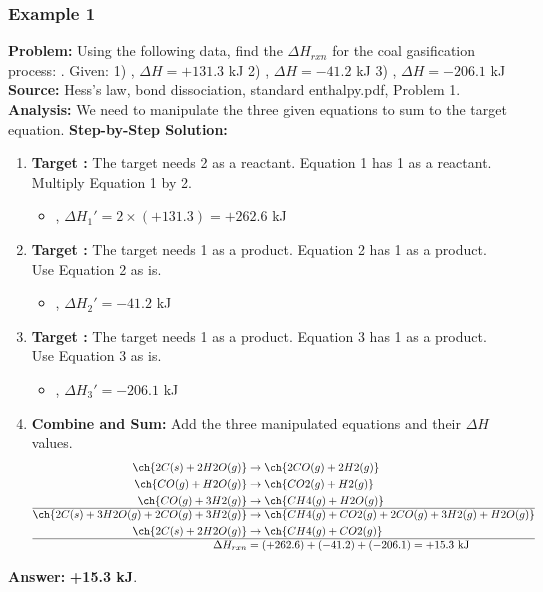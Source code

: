 \documentclass{article}
\begin{document}
\subsubsection{Example 1}
\textbf{Problem:} Using the following data, find the $\Delta H_{rxn}$ for the coal gasification process: .
Given:
1) , $\Delta H = +131.3$ kJ
2) , $\Delta H = -41.2$ kJ
3) , $\Delta H = -206.1$ kJ
\textbf{Source:} Hess's law, bond dissociation, standard enthalpy.pdf, Problem 1.
\textbf{Analysis:} We need to manipulate the three given equations to sum to the target equation.
\textbf{Step-by-Step Solution:}
\begin{enumerate}
    \item \textbf{Target :} The target needs 2  as a reactant. Equation 1 has 1  as a reactant. Multiply Equation 1 by 2.
    \begin{itemize}
        \item {}, $\Delta H_1' = 2 \times (+131.3) = +262.6$ kJ
    \end{itemize}
    \item \textbf{Target :} The target needs 1  as a product. Equation 2 has 1  as a product. Use Equation 2 as is.
    \begin{itemize}
        \item {}, $\Delta H_2' = -41.2$ kJ
    \end{itemize}
    \item \textbf{Target :} The target needs 1  as a product. Equation 3 has 1  as a product. Use Equation 3 as is.
    \begin{itemize}
        \item {}, $\Delta H_3' = -206.1$ kJ
    \end{itemize}
    \item \textbf{Combine and Sum:} Add the three manipulated equations and their $\Delta H$ values.
    \begin{align*}
        \ch{2C(s) + 2H2O(g)} &\rightarrow \ch{2CO(g) + 2H2(g)} \\
        \ch{CO(g) + H2O(g)} &\rightarrow \ch{CO2(g) + H2(g)} \\
        \ch{CO(g) + 3H2(g)} &\rightarrow \ch{CH4(g) + H2O(g)} \\
        \hline
        \ch{2C(s) + 3H2O(g) + 2CO(g) + 3H2(g)} &\rightarrow \ch{CH4(g) + CO2(g) + 2CO(g) + 3H2(g) + H2O(g)} \\
        \ch{2C(s) + 2H2O(g)} &\rightarrow \ch{CH4(g) + CO2(g)} \\
        \hline
        \Delta H_{rxn} &= (+262.6) + (-41.2) + (-206.1) = +15.3 \text{ kJ}
    \end{align*}
\end{enumerate}
\textbf{Answer:} \textbf{+15.3 kJ}.
\end{document}
